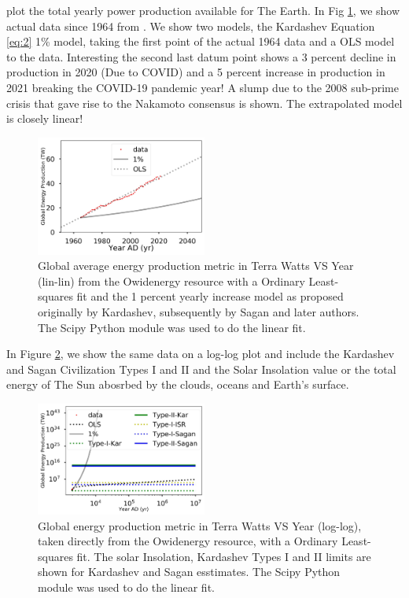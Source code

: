 \documentclass[final,5p,times,twocolumn,authoryear]{elsarticle}
\begin{document}
plot the total yearly power production available for The Earth. In Fig \ref{fig:kardashev1}, we show actual data since 1964 from \cite{owidenergy}. We show two models, the Kardashev Equation \ref{eq:2} 1\% model, taking the first point of the actual 1964 data and a OLS model to the data. Interesting the second last datum point shows a 3 percent decline in production in 2020 (Due to COVID) and a 5 percent increase in production in 2021 breaking the COVID-19 pandemic year! A slump due to the 2008 sub-prime crisis that gave rise to the Nakamoto consensus is shown. The extrapolated model is closely linear!
\begin{figure}
    \centering
    \includegraphics[width=0.5\textwidth]{figs/fig1_kard.jpg}
    \caption{Global average energy production metric in Terra Watts VS Year (lin-lin) from the Owidenergy resource with a Ordinary Least-squares fit and the 1 percent yearly increase model as proposed originally by Kardashev, subsequently by Sagan and later authors. The Scipy Python module was used to do the linear fit.}
    \label{fig:kardashev1}

\end{figure}

In Figure \ref{fig:kardashev3}, we show the same data on a log-log plot and include the Kardashev and Sagan Civilization Types I and II and the Solar Insolation value or the total energy of The Sun abosrbed by the clouds, oceans and Earth's surface. %


\begin{figure}
    \centering
    \includegraphics[width=0.5\textwidth]{figs/fig2_kar.jpg}
    \caption{Global energy production metric in Terra Watts VS Year (log-log), taken directly from the Owidenergy resource, with a Ordinary Least-squares fit. The solar Insolation, Kardashev Types I and II limits are shown for Kardashev and Sagan esstimates. The Scipy Python module was used to do the linear fit.}
    \label{fig:kardashev3}

\end{figure}
\end{document}
